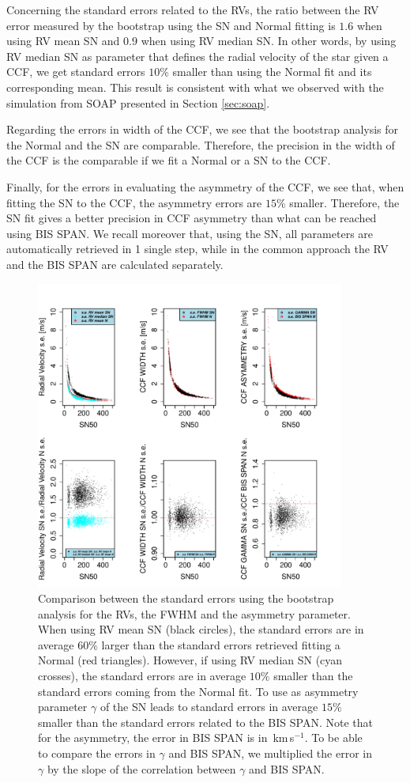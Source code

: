 \documentclass[11pt, oneside]{article}
\def\kms{\hbox{\,km\,s$^{-1}$}}       %
\begin{document}
{Concerning the standard errors related to the RVs, the ratio between the RV error measured by the bootstrap using the SN and Normal fitting is $1.6$ when using RV mean SN and $0.9$ when using RV median SN. In other words, by using RV median SN as parameter that defines the radial velocity of the star given a CCF, we get standard errors $10\%$ smaller than using the Normal fit and its corresponding mean. This result is consistent with what we observed with the simulation from SOAP presented in Section \ref{sec:soap}.

Regarding the errors in width of the CCF, we see that the bootstrap analysis for the Normal and the SN are comparable. Therefore, the precision in the width of the CCF is the comparable if we fit a Normal or a SN to the CCF.

Finally, for the errors in evaluating the asymmetry of the CCF, we see that, when fitting the SN to the CCF, the asymmetry errors are $15\%$ smaller. Therefore, the SN fit gives a better precision in CCF asymmetry than what can be reached using BIS SPAN. We recall moreover that, using the SN, all parameters are automatically retrieved in 1 single step, while in the common approach the RV and the BIS SPAN are calculated separately.

%
\begin{figure}[htbp]
   \centering
\includegraphics[height = 4in]{[5]Errors_vs_SNR_all_stars.pdf} 
   \caption{Comparison between the standard errors using the bootstrap analysis for the RVs, the FWHM and the asymmetry parameter. When using RV mean SN (black circles), the standard errors are in average $60\%$ larger than the standard errors retrieved fitting a Normal (red triangles). However, if using RV median SN (cyan crosses), the standard errors are in average $10\%$ smaller than the standard errors coming from the Normal fit. To use as asymmetry parameter $\gamma$ of the SN leads to standard errors in average $15\%$ smaller than the standard errors related to the BIS SPAN. Note that for the asymmetry, the error in BIS SPAN is in \kms. To be able to compare the errors in $\gamma$ and BIS SPAN, we multiplied the error in $\gamma$ by the slope of the correlation between $\gamma$ and BIS SPAN.}
   \label{fig:se}
\end{figure}

}
\end{document}
